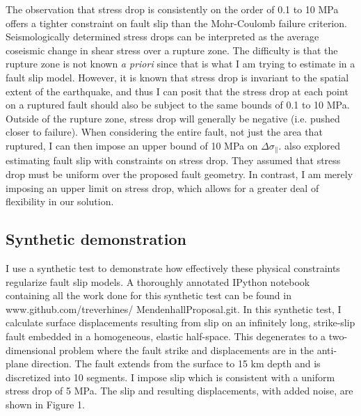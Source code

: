 \documentclass[12pt]{article}
\begin{document}
The observation that stress drop is consistently on the order of 0.1 to 10 MPa offers a tighter constraint on fault slip than the Mohr-Coulomb failure criterion.  Seismologically determined stress drops can be interpreted as the average coseismic change in shear stress over a rupture zone.  The difficulty is that the rupture zone is not known \textit{a priori} since that is what I am trying to estimate in a fault slip model.  However, it is known that stress drop is invariant to the spatial extent of the earthquake, and thus I can posit that the stress drop at each point on a ruptured fault should also be subject to the same bounds of 0.1 to 10 MPa.  Outside of the rupture zone, stress drop will generally be negative (i.e. pushed closer to failure).  When considering the entire fault, not just the area that ruptured, I can then impose an upper bound of 10 MPa on $\Delta \sigma_\parallel$.  \citet{Sun2011} also explored estimating fault slip with constraints on stress drop.  They assumed that stress drop must be uniform over the proposed fault geometry.  In contrast, I am merely imposing an upper limit on stress drop, which allows for a greater deal of flexibility in our solution.        

\subsection*{Synthetic demonstration}
I use a synthetic test to demonstrate how effectively these physical constraints regularize fault slip models.  A thoroughly annotated IPython notebook containing all the work done for this synthetic test can be found in www.github.com/treverhines/ MendenhallProposal.git.  In this synthetic test, I calculate surface displacements resulting from slip on an infinitely long, strike-slip fault embedded in a homogeneous, elastic half-space.  This degenerates to a two-dimensional problem where the fault strike and displacements are in the anti-plane direction.  The fault extends from the surface to 15 km depth and is discretized into 10 segments. I impose slip which is consistent with a uniform stress drop of 5 MPa.  The slip and resulting displacements, with added noise, are shown in Figure 1.
\end{document}
